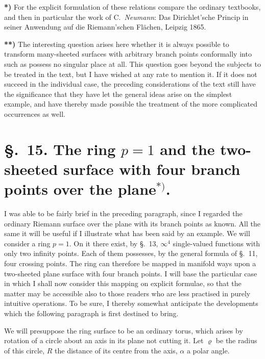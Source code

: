 \documentclass{article}
\begin{document}
\textbf{*)} For the explicit formulation of these relations compare the ordinary textbooks, and then in particular the work of C.\ \emph{Neumann}: Das Dirichlet'sche Princip in seiner Anwendung auf die Riemann'schen Flächen, Leipzig 1865.

\textbf{**)} The interesting question arises here whether it is always possible to transform many-sheeted surfaces with arbitrary branch points conformally into such as possess no singular place at all. This question goes beyond the subjects to be treated in the text, but I have wished at any rate to mention it. If it does not succeed in the individual case, the preceding considerations of the text still have the significance that they have let the general ideas arise on the simplest example, and have thereby made possible the treatment of the more complicated occurrences as well.


\section*{§.~15. The ring $p = 1$ and the two-sheeted surface with four branch points over the plane${}^{*)}$.}

I was able to be fairly brief in the preceding paragraph, since I regarded the ordinary Riemann surface over the plane with its branch points as known. All the same it will be useful if I illustrate what has been said by an example. We will consider a ring $p = 1$. On it there exist, by §.~13, $\infty^{4}$ single-valued functions with only two infinity points. Each of them possesses, by the general formula of §.~11, four crossing points. The ring can therefore be mapped in manifold ways upon a two-sheeted plane surface with four branch points. I will base the particular case in which I shall now consider this mapping on explicit formulae, so that the matter may be accessible also to those readers who are less practised in purely intuitive operations. To be sure, I thereby somewhat anticipate the developments which the following paragraph is first destined to bring.


We will presuppose the ring surface to be an ordinary torus, which arises by rotation of a circle about an axis in its plane not cutting it. Let $\varrho$ be the radius of this circle, $R$ the distance of its centre from the axis, $\alpha$ a polar angle.
\end{document}
